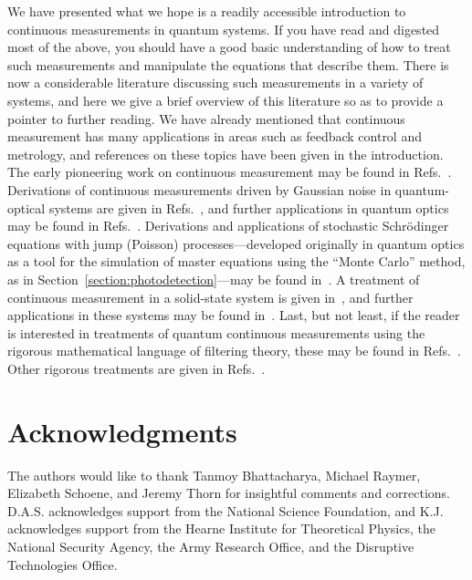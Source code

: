 \documentclass[12pt,aps,onecolum,superscriptaddress,footinbib,floatfix,showpacs]{revtex4-1}
\begin{document}
We have presented what we hope is a readily accessible introduction to
continuous measurements in quantum systems.  If you have read and
digested most of the above, you should have a good basic understanding
of how to treat such measurements and manipulate the equations that
describe them.  There is now a considerable literature discussing such
measurements in a variety of systems, and here we give a brief
overview of this literature so as to provide a pointer to further
reading.  We have already mentioned that continuous measurement has
many applications in areas such as feedback control and metrology, and
references on these topics have been given in the introduction.  The
early pioneering work on continuous measurement may be found in
Refs.~\cite{Srinivas81,Barchielli82, Gisin84, Barchielli85, Diosi86,
BelavkinLQG, Diosi88, Belavkin89}.  Derivations of continuous
measurements driven by Gaussian noise in quantum-optical systems are
given in Refs.~\cite{Carmichael89, Wiseman93, DJ}, and further
applications in quantum optics may be found in Refs.~\cite{Wiseman93c,
Carm93, Garraway94, Wiseman95, Wiseman96, Plenio98, WisemanLinQ}.
Derivations and applications of stochastic Schr\"{o}dinger equations
with jump (Poisson) processes---developed originally in quantum optics
as a tool for the simulation of master equations using the ``Monte
Carlo'' method, as in Section~\ref{section:photodetection}---may be
found in~\cite{Zoller87, Hegerfeldt91, Holland91, Dalibard92,
Gardiner92, PlenioPhD, Hegerfeldt96, Garraway94, Holland96, Plenio98}.
A treatment of continuous measurement in a solid-state system is
given in~\cite{Korotkov}, and further applications in these systems
may be found in~\cite{Goan01, Hopkins03, Brun03, Santamore04,
Ruskov05, Sarovar05, Jordan06}.  Last, but not least, if the reader is
interested in treatments of quantum continuous measurements using the
rigorous mathematical language of filtering theory, these may be found
in Refs.~\cite{Bouten06, Belavkin93, Belavkin94, BelavkinLQG}.  Other
rigorous treatments are given in Refs.~\cite{Barchielli85,
Barchielli93}.

\section{Acknowledgments}

The authors would like to thank Tanmoy Bhattacharya, Michael Raymer,
Elizabeth Schoene,
and Jeremy Thorn for insightful comments and corrections.
D.A.S. acknowledges support from the National Science Foundation, and 
K.J. acknowledges support from the Hearne Institute for Theoretical 
Physics, the National Security Agency, the Army
Research Office, and the Disruptive Technologies Office. 
\end{document}
